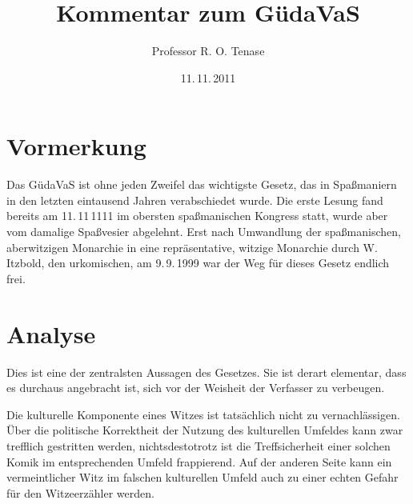 \documentclass{scrartcl}
\begin{document}
\title{Kommentar zum GüdaVaS}
\author{Professor R. O. Tenase}
\date{11.\,11.\,2011}
\maketitle
\tableofcontents

\section{Vormerkung}
Das GüdaVaS ist ohne jeden Zweifel das wichtigste Gesetz, das in
Spaßmaniern in den letzten eintausend Jahren verabschiedet wurde. 
Die erste Lesung fand bereits am 11.\,11\,1111 im obersten 
spaßmanischen Kongress statt, wurde aber vom damalige Spaßvesier
abgelehnt. Erst nach Umwandlung der spaßmanischen, aberwitzigen Monarchie
in eine repräsentative, witzige Monarchie durch W. Itzbold, den
urkomischen, am 9.\,9.\,1999 war der Weg für dieses Gesetz endlich frei.

\section{Analyse}

\begin{addmargin}[0pt]{.333\textwidth}
  Dies ist eine der zentralsten Aussagen des Gesetzes. Sie ist derart
  elementar, dass es durchaus angebracht ist, sich vor der Weisheit der
  Verfasser zu verbeugen.

  \syncwithnotecolumn[paragraphs]\bigskip
  Die kulturelle Komponente eines Witzes ist tatsächlich nicht zu
  vernachlässigen. Über die politische Korrektheit der Nutzung des kulturellen
  Umfeldes kann zwar trefflich gestritten werden, nichtsdestotrotz ist die
  Treffsicherheit einer solchen Komik im entsprechenden Umfeld frappierend. Auf
  der anderen Seite kann ein vermeintlicher Witz im falschen kulturellen
  Umfeld auch zu einer echten Gefahr für den Witzeerzähler werden.
\end{addmargin}
\end{document}
